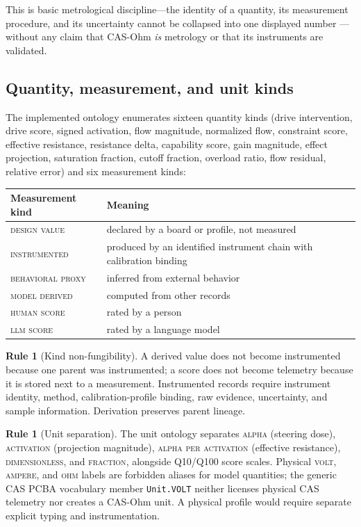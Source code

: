 \documentclass[11pt]{amsart}
\theoremstyle{definition}
\newtheorem{ruleenv}[theorem]{Rule}
\theoremstyle{remark}
\begin{document}
This is basic metrological discipline---the identity of a quantity, its measurement procedure, and its uncertainty cannot be collapsed into one displayed number \cite{vim,gum}---without any claim that CAS-Ohm \emph{is} metrology or that its instruments are validated.

\subsection{Quantity, measurement, and unit kinds}
The implemented ontology enumerates sixteen quantity kinds (drive intervention, drive score, signed activation, flow magnitude, normalized flow, constraint score, effective resistance, resistance delta, capability score, gain magnitude, effect projection, saturation fraction, cutoff fraction, overload ratio, flow residual, relative error) and six measurement kinds:

\begin{center}
\small
\begin{tabular}{@{}ll@{}}
\toprule
Measurement kind & Meaning \\
\midrule
\textsc{design value} & declared by a board or profile, not measured \\
\textsc{instrumented} & produced by an identified instrument chain with calibration binding \\
\textsc{behavioral proxy} & inferred from external behavior \\
\textsc{model derived} & computed from other records \\
\textsc{human score} & rated by a person \\
\textsc{llm score} & rated by a language model \\
\bottomrule
\end{tabular}
\end{center}

\begin{ruleenv}[Kind non-fungibility]\label{rule:kinds}
A derived value does not become instrumented because one parent was instrumented; a score does not become telemetry because it is stored next to a measurement. Instrumented records require instrument identity, method, calibration-profile binding, raw evidence, uncertainty, and sample information. Derivation preserves parent lineage.
\end{ruleenv}

\begin{ruleenv}[Unit separation]\label{rule:units}
The unit ontology separates \textsc{alpha} (steering dose), \textsc{activation} (projection magnitude), \textsc{alpha per activation} (effective resistance), \textsc{dimensionless}, and \textsc{fraction}, alongside Q10/Q100 score scales. Physical \textsc{volt}, \textsc{ampere}, and \textsc{ohm} labels are forbidden aliases for model quantities; the generic CAS PCBA vocabulary member \texttt{Unit.VOLT} neither licenses physical CAS telemetry nor creates a CAS-Ohm unit. A physical profile would require separate explicit typing and instrumentation.
\end{ruleenv}
\end{document}
